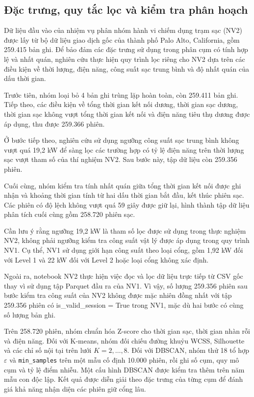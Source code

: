 \documentclass[conference,a4paper]{IEEEtran}
\begin{document}
\subsection{Đặc trưng, quy tắc lọc và kiểm tra phân hoạch}

Dữ liệu đầu vào của nhiệm vụ phân nhóm hành vi chiếm dụng trạm sạc (NV2) được lấy từ bộ dữ liệu giao dịch gốc của thành phố Palo Alto, California, gồm 259.415 bản ghi. Để bảo đảm các đặc trưng sử dụng trong phân cụm có tính hợp lệ và nhất quán, nghiên cứu thực hiện quy trình lọc riêng cho NV2 dựa trên các điều kiện về thời lượng, điện năng, công suất sạc trung bình và độ nhất quán của dấu thời gian.

Trước tiên, nhóm loại bỏ 4 bản ghi trùng lặp hoàn toàn, còn 259.411 bản ghi. Tiếp theo, các điều kiện về tổng thời gian kết nối dương, thời gian sạc dương, thời gian sạc không vượt tổng thời gian kết nối và điện năng tiêu thụ dương được áp dụng, thu được 259.366 phiên.

Ở bước tiếp theo, nghiên cứu sử dụng ngưỡng công suất sạc trung bình không vượt quá 19,2 kW để sàng lọc các trường hợp có tỷ lệ điện năng trên thời lượng sạc vượt tham số của thí nghiệm NV2. Sau bước này, tập dữ liệu còn 259.356 phiên.

Cuối cùng, nhóm kiểm tra tính nhất quán giữa tổng thời gian kết nối được ghi nhận và khoảng thời gian tính từ hai dấu thời gian bắt đầu, kết thúc phiên sạc. Các phiên có độ lệch không vượt quá 59 giây được giữ lại, hình thành tập dữ liệu phân tích cuối cùng gồm 258.720 phiên sạc.

Cần lưu ý rằng ngưỡng 19,2 kW là tham số lọc được sử dụng trong thực nghiệm NV2, không phải ngưỡng kiểm tra công suất vật lý được áp dụng trong quy trình NV1. Cụ thể, NV1 sử dụng giới hạn công suất theo loại cổng, gồm 1,92 kW đối với Level 1 và 22 kW đối với Level 2 hoặc loại cổng không xác định.

Ngoài ra, notebook NV2 thực hiện việc đọc và lọc dữ liệu trực tiếp từ CSV gốc thay vì sử dụng tập Parquet đầu ra của NV1. Vì vậy, số lượng 259.356 phiên sau bước kiểm tra công suất của NV2 không được mặc nhiên đồng nhất với tập 259.356 phiên có is\_valid\_session = True trong NV1, mặc dù hai bước có cùng số lượng bản ghi.

Trên 258.720 phiên, nhóm chuẩn hóa Z-score cho thời gian sạc, thời gian nhàn rỗi và điện năng. Đối với K-means, nhóm đối chiếu đường khuỷu WCSS, Silhouette và các chỉ số nội tại trên lưới $K=2,\ldots,8$. Đối với DBSCAN, nhóm thử 18 tổ hợp $\varepsilon$ và \texttt{min\_samples} trên một mẫu cố định 10.000 phiên, rồi ghi số cụm, quy mô cụm và tỷ lệ điểm nhiễu. Một cấu hình DBSCAN được kiểm tra thêm trên năm mẫu con độc lập. Kết quả được diễn giải theo đặc trưng của từng cụm để đánh giá khả năng nhận diện các phiên giữ cổng lâu.
\end{document}
